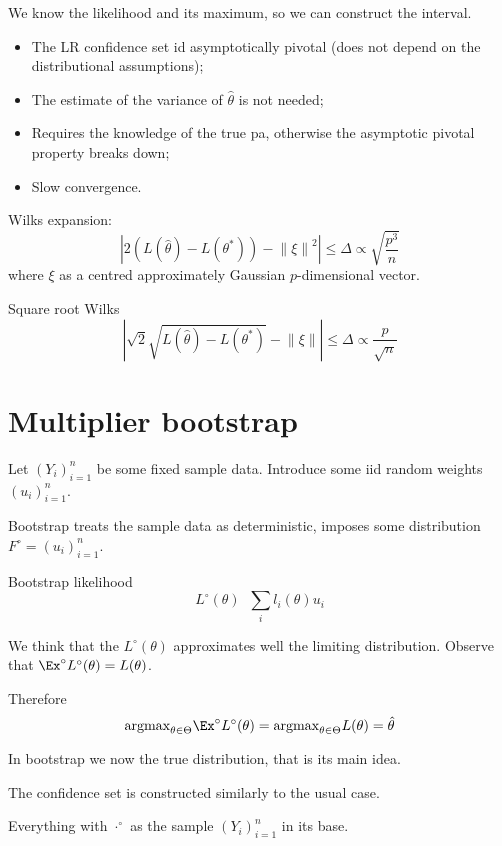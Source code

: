 \documentclass[a4paper]{article}
\newcommand{\brac}[1]{{\left ( #1 \right )}}
\newcommand{\abs}[1]{{\left | #1 \right |}}
\newcommand{\nrm}[1]{{\left\| #1 \right \|}}
\newcommand{\defn}{\mathop{\overset{\Delta}{=}}\nolimits}
\begin{document}
We know the likelihood and its maximum, so we can construct the interval.

\begin{itemize}
	\item The LR confidence set id asymptotically pivotal (does not depend on the distributional assumptions);
	\item The estimate of the variance of $\hat{\theta}$ is not needed;
	\item Requires the knowledge of the true pa, otherwise the asymptotic pivotal property breaks down;
	\item Slow convergence. 
\end{itemize}

Wilks expansion:
\[\abs{ 2\brac{L(\hat{\theta}) - L(\theta^*) } - \nrm{\xi}^2 } \leq \Delta \propto \sqrt{\frac{p^3}{n}}\]
where $\xi$ as a centred approximately Gaussian $p$-dimensional vector.

Square root Wilks
\[\abs{ \sqrt{2}\sqrt{L(\hat{\theta}) - L(\theta^*) } - \nrm{\xi} } \leq \Delta \propto \frac{p}{\sqrt{n}}\]


\section{Multiplier bootstrap} %
\label{sec:multiplier_bootstrap}

Let $\brac{Y_i}_{i=1}^n$ be some fixed sample data. Introduce some iid random weights $\brac{u_i}_{i=1}^n$.

Bootstrap treats the sample data as deterministic, imposes some distribution $F^\circ = \brac{u_i}_{i=1}^n$.

Bootstrap likelihood
\[ L^\circ(\theta) \defn \sum_i l_i(\theta)u_i\]

We think that the $L^\circ(\theta)$ approximates well the limiting distribution.
Observe that $\Ex^\circ L^\circ(\theta) = L(\theta)$.

Therefore 
\[\text{argmax}_{\theta\in \Theta} \Ex^\circ L^\circ(\theta) = \text{argmax}_{\theta\in \Theta} L(\theta) = \hat{\theta}\]

In bootstrap we now the true distribution, that is its main idea.

The confidence set is constructed similarly to the usual case.

Everything with ${\cdot}^\circ$ as the sample $\brac{Y_i}_{i=1}^n$ in its base.
\end{document}
